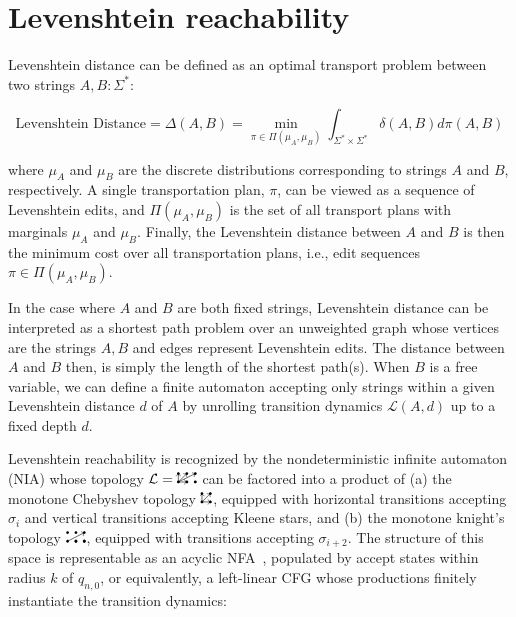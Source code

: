 \documentclass[sigplan,review,anonymous,acmsmall]{acmart}\settopmatter{printfolios=false,printccs=false,printacmref=false}
\begin{document}
\pagebreak
\section{Levenshtein reachability}\label{sec:levenshtein}

Levenshtein distance can be defined as an optimal transport problem between two strings $A, B: \Sigma^*$:

\begin{equation}
\text{Levenshtein Distance} = \Delta(A, B) = \min_{\pi \in \Pi(\mu_A, \mu_B)} \int_{\Sigma^* \times \Sigma^*} \delta(A, B) d\pi(A, B)
\end{equation}

\noindent where $\mu_A$ and $\mu_B$ are the discrete distributions corresponding to strings $A$ and $B$, respectively. A single transportation plan, $\pi$, can be viewed as a sequence of Levenshtein edits, and $\Pi(\mu_A, \mu_B)$ is the set of all transport plans with marginals $\mu_A$ and $\mu_B$. Finally, the Levenshtein distance between $A$ and $B$ is then the minimum cost over all transportation plans, i.e., edit sequences $\pi \in \Pi(\mu_A, \mu_B)$.

In the case where $A$ and $B$ are both fixed strings, Levenshtein distance can be interpreted as a shortest path problem over an unweighted graph whose vertices are the strings $A, B$ and edges represent Levenshtein edits. The distance between $A$ and $B$ then, is simply the length of the shortest path(s). When $B$ is a free variable, we can define a finite automaton accepting only strings within a given Levenshtein distance $d$ of $A$ by unrolling transition dynamics $\mathcal{L}(A, d)$ up to a fixed depth $d$.

Levenshtein reachability is recognized by the nondeterministic infinite automaton (NIA) whose topology $\mathcal{L} = \knightkingarrow$ can be factored into a product of (a) the monotone Chebyshev topology $\kingarrow$, equipped with horizontal transitions accepting $\sigma_{i}$ and vertical transitions accepting Kleene stars, and (b) the monotone knight's topology $\knightarrow$, equipped with transitions accepting $\sigma_{i+2}$. The structure of this space is representable as an acyclic NFA~\cite{schulz2002fast}, populated by accept states within radius $k$ of $q_{n,0}$, or equivalently, a left-linear CFG whose productions finitely instantiate the transition dynamics:
\end{document}
